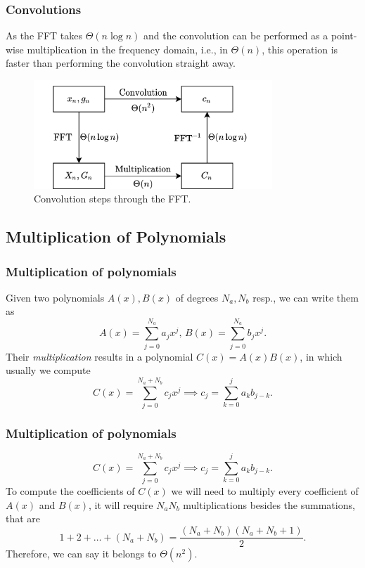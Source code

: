 \documentclass{beamer}
\begin{document}
\begin{frame}
    \frametitle{Convolutions}
    As the FFT takes $\Theta\left( n \log n \right) $ and the convolution can be performed as a point-wise multiplication in the frequency domain, i.e., in $\Theta\left( n \right) $, this operation is faster than performing the convolution straight away.
    \begin{figure}
        \centering
        \includegraphics[width=0.8\textwidth]{convolution_fft.png}
        \caption{Convolution steps through the FFT.}
        \label{fig:convolution_fft-png}
    \end{figure}
\end{frame}

\subsection{Multiplication of Polynomials}

\begin{frame}
    \frametitle{Multiplication of polynomials}
    Given two polynomials $A(x),B(x)$ of degrees $N_a,N_b$ resp., we can write them as \[
    A\left( x \right) = \sum_{j=0}^{N_a} a_j x^{j},\, B\left( x \right) = \sum_{j=0}^{N_a} b_j x^{j}
    .\] Their \emph{multiplication} results in a polynomial $C\left( x \right) = A(x)B(x)$, in which usually we compute \[
    C(x) = \sum_{j=0}^{N_a+N_b} c_j x^{j} \implies c_j = \sum_{k=0}^{j} a_k b_{j-k}
.\]
\end{frame}

\begin{frame}
    \frametitle{Multiplication of polynomials}
    \[
    C(x) = \sum_{j=0}^{N_a+N_b} c_j x^{j} \implies c_j = \sum_{k=0}^{j} a_k b_{j-k}
.\] To compute the coefficients of $C(x)$ we will need to multiply every coefficient of $A(x)$ and $B(x)$, it will require $N_aN_b$ multiplications besides the summations, that are \[
1 + 2 + \ldots + \left( N_a+N_b \right) = \frac{\left( N_a+N_b \right) \left( N_a+N_b +1\right) }{2}
.\] 
Therefore, we can say it belongs to $\Theta(n^2)$.
\end{frame}
\end{document}
